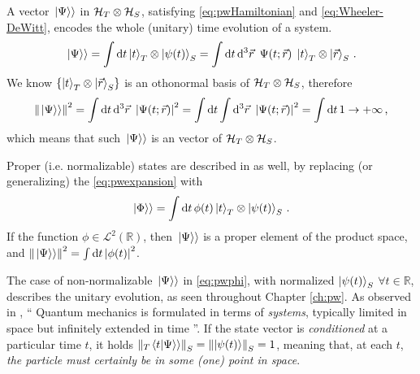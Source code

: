 A vector $\left.\left| \Psi \right\rangle\right\rangle$ in $\mathcal{H}_T \otimes \mathcal{H}_S$,
satisfying \eqref{eq:pwHamiltonian} and \eqref{eq:Wheeler-DeWitt},
encodes the whole (unitary) time evolution of a system.
\begin{equation}\label{eq:pwexpansion}
  \left.\left| \Psi \right\rangle\right\rangle =
    \int \dd{t} \ket{t}_T \otimes \ket{\psi(t)}_S =
    \int \dd{t}\dd[3]{\vec{r}} \ \Psi(t; \vec{r}) \; \ket{t}_T \otimes \ket{\vec{r}}_S
    \,  \text{.}
\end{equation}
We know $\left\{\ket{t}_T \otimes \ket{\vec{r}}_S\right\}$ is an othonormal basis of $\mathcal{H}_T \otimes \mathcal{H}_S$, therefore
\begin{equation}
  \norm{\left.\left| \Psi \right\rangle\right\rangle}^2 =
    \int \dd{t}\dd[3]{\vec{r}} \ \abs{\Psi(t; \vec{r})}^2 =
    \int \dd{t} \int \dd[3]{\vec{r}} \ \abs{\Psi(t; \vec{r})}^2 =
    \int \dd{t} 1 \rightarrow +\infty
    \,  \text{,}
\end{equation}
which means that such $\left.\left| \Psi \right\rangle\right\rangle$ is an  vector of $\mathcal{H}_T \otimes \mathcal{H}_S$.

Proper (i.e. normalizable) states are described in \citereset\cite{Lloyd:Time} as well, by replacing (or generalizing)
the \eqref{eq:pwexpansion} with
\begin{equation}\label{eq:pwphi}
  \left.\left| \Phi \right\rangle\right\rangle =
    \int \dd{t} \phi(t) \ket{t}_T \otimes \ket{\psi(t)}_S \, \text{.}
\end{equation}
If the function $\phi \in \mathscr{L}^2(\mathbb{R})$,
then $\left.\left| \Psi \right\rangle\right\rangle$ is a proper element of the product space,
and $\norm{\left.\left| \Psi \right\rangle\right\rangle}^2 = \int \dd{t} \abs{\phi(t)}^2$.

The case of non-normalizable $\left.\left| \Psi \right\rangle\right\rangle$ in \eqref{eq:pwphi},
with normalized $\ket{\psi(t)}_S$ $\forall t \in \mathbb{R}$,
describes the unitary evolution, as seen throughout Chapter \ref{ch:pw}.
As observed in \cite{Maccone:QGR},
``%
  Quantum mechanics is formulated in terms of \emph{systems},
  typically limited in space but infinitely extended in time%
''.
If the state vector is \emph{conditioned} at a particular time $t$,
it holds $\norm{_{T}\!\left.\left\langle t \middle| \Psi \right\rangle\right\rangle}_S = \norm{\ket{\psi(t)}}_S = 1$,
meaning that, at each $t$,
\emph{the particle must certainly be in some (one) point in space}.

